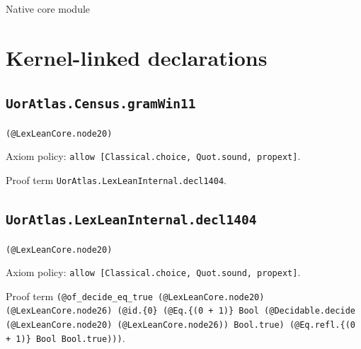 \documentclass[11pt]{article}
\begin{document}
\begin{center}{\LARGE Native core module}\end{center}
\section*{Kernel-linked declarations}
\subsection*{\texttt{UorAtlas.Census.gramWin11}}
\noindent\texttt{(@LexLeanCore.node20)}\par
\noindent Axiom policy: \texttt{allow [Classical.choice, Quot.sound, propext]}.\par
\noindent Proof term \texttt{UorAtlas.LexLeanInternal.decl1404}.\par
\subsection*{\texttt{UorAtlas.LexLeanInternal.decl1404}}
\noindent\texttt{(@LexLeanCore.node20)}\par
\noindent Axiom policy: \texttt{allow [Classical.choice, Quot.sound, propext]}.\par
\noindent Proof term \texttt{(@of\_decide\_eq\_true (@LexLeanCore.node20) (@LexLeanCore.node26) (@id.\{0\} (@Eq.\{(0 + 1)\} Bool (@Decidable.decide (@LexLeanCore.node20) (@LexLeanCore.node26)) Bool.true) (@Eq.refl.\{(0 + 1)\} Bool Bool.true)))}.\par
\end{document}
